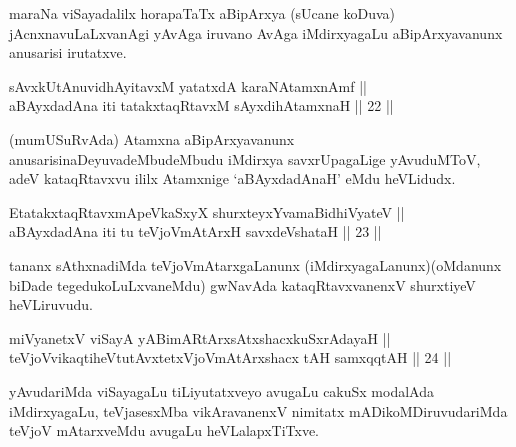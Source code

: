 \begin{artha}
maraNa viSayadalilx horapaTaTx aBipArxya (sUcane koDuva)
jAcnxnavuLaLxvanAgi yAvAga iruvano AvAga iMdirxyagaLu\break
aBipArxyavanunx anusarisi irutatxve.
\end{artha}


\begin{shl}
sAvxkUtAnuvidhAyitavxM yatatxdA karaNAtamxnAmf || \\
aBAyxdadAna iti tatakxtaqRtavxM sAyxdihA\s \s tamxnaH \hfill || 22 ||
  
\end{shl}

\begin{artha}
(mumUSuRvAda) Atamxna aBipArxyavanunx anusarisi\break naDeyuvadeMbudeMbudu
iMdirxya savxrUpagaLige yAvuduMToV, adeV kataqRtavxvu ililx Atamxnige
`aBAyxdadAnaH' eMdu heVLidudx.
\end{artha}

\begin{shl}
EtatakxtaqRtavxmApeVkaSxyX shurxteyxYvamaBidhiVyateV || \\
aBAyxdadAna iti tu teVjoVmAtArxH savxdeVshataH \hfill || 23 ||
  
\end{shl}

\begin{artha}
tananx sAthxnadiMda teVjoVmAtarxgaLanunx (iMdirxyagaLanunx)\break (oMdanunx
biDade tegedukoLuLxvaneMdu) gwNavAda kataqRtavxvanenxV shurxtiyeV
heVLiruvudu.
\end{artha}


\begin{shl}
miVyanetxV viSayA yABimARtArxsAtxshacxkuSxrAdayaH || \\
teVjoVvikaqtiheVtutAvxtetxVjoVmAtArxshacx tAH samxqqtAH \hfill || 24 ||
  
\end{shl}

\begin{artha}
yAvudariMda viSayagaLu tiLiyutatxveyo avugaLu cakuSx modalAda
iMdirxyagaLu, teVjasesxMba vikAravanenxV nimitatx mADikoMDiruvudariMda
teVjoV mAtarxveMdu avugaLu heVLalapxTiTxve.
\end{artha}



